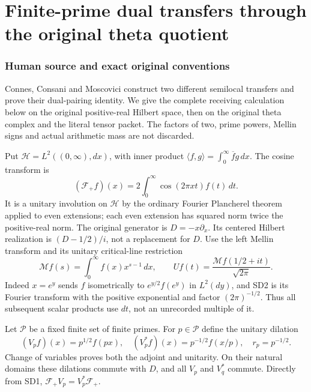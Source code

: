 \documentclass[11pt]{article}
\begin{document}
\endgroup

\clearpage\begingroup
\part*{Finite-prime dual transfers through the original theta quotient}
\newcommand{\swdualC}{\mathbb C}
\newcommand{\swdualB}{\mathscr B}
\newcommand{\swdualM}{\mathcal M}
\newcommand{\swdualF}{\mathcal F_+}


\section{Human source and exact original conventions}
Connes, Consani and Moscovici \cite[Propositions groundstate,
sonintensor and groundstatedual; Theorem isosonin]{swdual:CCM} construct two
different semilocal transfers and prove their dual-pairing identity.
We give the complete receiving calculation below on the original
positive-real Hilbert space, then on the original theta complex and
the literal tensor packet. The factors of two, prime powers, Mellin
signs and actual arithmetic mass are not discarded.

Put $\mathcal H=L^2((0,\infty),dx)$, with inner product
$\langle f,g\rangle=\int_0^\infty\overline f g\,dx$.
The cosine transform is
\[
 (\swdualF f)(x)=2\int_0^\infty\cos(2\pi xt)f(t)\,dt.
                                                               \tag{SD1}
\]
It is a unitary involution on $\mathcal H$ by the ordinary Fourier
Plancherel theorem applied to even extensions; each even extension
has squared norm twice the positive-real norm. The original generator
is $D=-x\partial_x$. Its centered Hilbert realization is
$(D-1/2)/i$, not a replacement for $D$.
Use the left Mellin transform and its unitary critical-line restriction
\[
 \swdualM f(s)=\int_0^\infty f(x)x^{s-1}\,dx,\qquad
 Uf(t)=\frac{\swdualM f(1/2+it)}{\sqrt{2\pi}}.                       \tag{SD2}
\]
Indeed $x=e^y$ sends $f$ isometrically to $e^{y/2}f(e^y)$ in
$L^2(dy)$, and SD2 is its Fourier transform with the positive
exponential and factor $(2\pi)^{-1/2}$. Thus all subsequent scalar
products use $dt$, not an unrecorded multiple of it.

Let $\mathcal P$ be a fixed finite set of finite primes. For $p\in
\mathcal P$ define the unitary dilation
\[
 (V_pf)(x)=p^{1/2}f(px),\quad
 (V_p^*f)(x)=p^{-1/2}f(x/p),\quad r_p=p^{-1/2}.
                                                               \tag{SD3}
\]
Change of variables proves both the adjoint and unitarity. On their
natural domains these dilations commute with $D$, and all $V_p$ and
$V_q^*$ commute. Directly from SD1, $\swdualF V_p=V_p^*\swdualF$.
\end{document}

